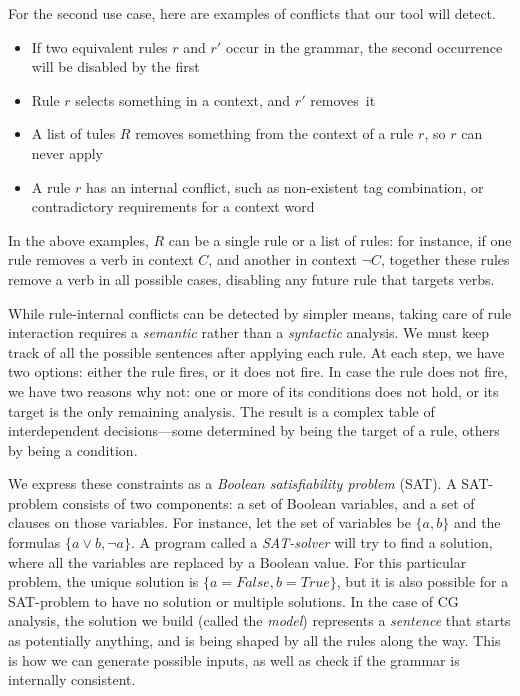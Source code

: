 
For the second use case, here are examples of conflicts that our tool will detect.
\begin{itemize}
\item If two equivalent rules $r$ and $r'$ occur in the grammar, the second occurrence will be disabled by the first
\item Rule $r$ selects something in a context, and $r'$ removes~it
\item A list of tules $R$ removes something from the context of a rule $r$, so $r$ can never
  apply
\item A rule $r$ has an internal conflict, such as non-existent
tag combination, or contradictory requirements for a context word
\end{itemize}
In the above examples, $R$ can be a single rule or a list of rules: for instance, if one rule removes a verb in
context $C$, and another in context $\neg C$, together these rules
remove a verb in all possible cases, disabling any future rule that
targets verbs.

While rule-internal conflicts can be detected by simpler means, taking
care of rule interaction requires a {\em semantic} rather than a {\em
 syntactic} analysis.
We must keep track of all the possible sentences after applying each
rule. At each step, we have two options: either the rule fires,
or it does not fire. In case the rule does not fire, we have two
reasons why not: one or more of its conditions does not hold, or its
target is the only remaining analysis. The result is a complex table
of interdependent decisions---some determined by being the target of a
rule, others by being a condition.

We express these constraints as a \emph{Boolean satisfiability problem} (SAT).
A SAT-problem consists of two components: a set of Boolean variables, and a set
of clauses on those variables. For instance, let the set of variables
be $\{a, b\}$ and the formulas $\{a \vee b, \neg{}a\}$. A program called a
\emph{SAT-solver} will try to find a solution, where all the variables
are replaced by a Boolean value. For this particular problem, the
unique solution is $\{a=False, b=True\}$, but it is also possible for a
SAT-problem to have no solution or multiple solutions.
In the case of CG analysis, the solution we build (called the \emph{model}) represents a \emph{sentence} that starts as potentially anything, and is being shaped by all the
rules along the way. This is how we can generate possible inputs, as
well as check if the grammar is internally consistent.

